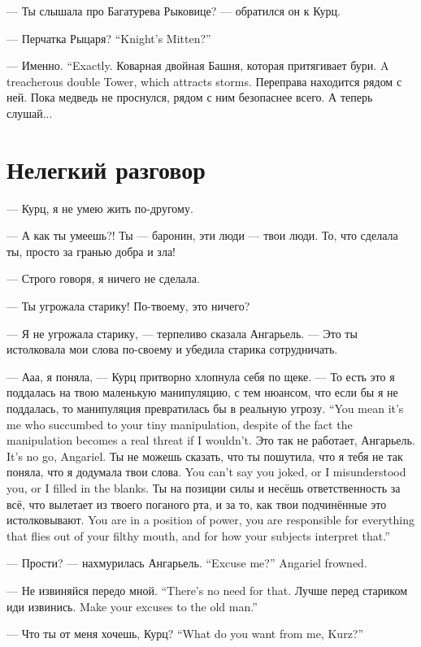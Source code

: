 --- Ты слышала про Багатурева Рыковице? --- обратился он к Курц.

{--- Перчатка Рыцаря?}
{``Knight's Mitten?''}

{--- Именно.}
{``Exactly.}
{Коварная двойная Башня, которая притягивает бури.}
{A treacherous double Tower, which attracts storms.}
Переправа находится рядом с ней.
Пока медведь не проснулся, рядом с ним безопаснее всего.
А теперь слушай...

\section{Нелегкий разговор}

--- Курц, я не умею жить по-другому.

--- А как ты умеешь?!
Ты --- баронин, эти люди --- твои люди.
То, что сделала ты, просто за гранью добра и зла!

--- Строго говоря, я ничего не сделала.

--- Ты угрожала старику!
По-твоему, это ничего?

--- Я не угрожала старику, --- терпеливо сказала Ангарьель.
--- Это ты истолковала мои слова по-своему и убедила старика сотрудничать.

--- Ааа, я поняла, --- Курц притворно хлопнула себя по щеке.
{--- То есть это я поддалась на твою маленькую манипуляцию, с тем нюансом, что если бы я не поддалась, то манипуляция превратилась бы в реальную угрозу.}
{``You mean it's me who succumbed to your tiny manipulation, despite of the fact the manipulation becomes a real threat if I wouldn't.}
{Это так не работает, Ангарьель.}
{It's no go, Angariel.}
{Ты не можешь сказать, что ты пошутила, что я тебя не так поняла, что я додумала твои слова.}
{You can't say you joked, or I misunderstood you, or I filled in the blanks.}
{Ты на позиции силы и несёшь ответственность за всё, что вылетает из твоего поганого рта, и за то, как твои подчинённые это истолковывают.}
{You are in a position of power, you are responsible for everything that flies out of your filthy mouth, and for how your subjects interpret that.''}

{--- Прости? --- нахмурилась Ангарьель.}
{``Excuse me?'' Angariel frowned.}

{--- Не извиняйся передо мной.}
{``There's no need for that.}
{Лучше перед стариком иди извинись.}
{Make your excuses to the old man.''}

{--- Что ты от меня хочешь, Курц?}
{``What do you want from me, Kurz?''}

